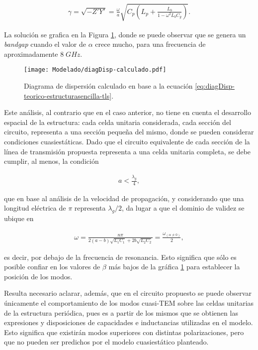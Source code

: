 \begin{align}
	\label{eq:diagDisp-teorico-estructurasencilla-tls}
	\gamma = \sqrt{-Z'Y'} = \frac{\omega}{a} \sqrt{C_p \left( L_p + \frac{L_b}{1-\omega^2 L_b C_g}\right)}.
\end{align}

La solución se grafica en la Figura \ref{fig:diagDisp-calculado-celdafacil}, donde se puede observar que se genera un \textit{bandgap} cuando el valor de $\alpha$ crece mucho, para una frecuencia de aproximadamente $8\;GHz$.

\begin{figure}[h]
	\centering
	\texttt{[image: Modelado/diagDisp-calculado.pdf]}
	\caption{Diagrama de dispersión calculado en base a la ecuación \ref{eq:diagDisp-teorico-estructurasencilla-tls}.}
	\label{fig:diagDisp-calculado-celdafacil}
\end{figure}

Este análisis, al contrario que en el caso anterior, no tiene en cuenta el desarrollo espacial de la estructura: cada celda unitaria considerada, cada sección del circuito, representa a una sección pequeña del mismo, donde se pueden considerar condiciones cuasiestáticas. Dado que el circuito equivalente de cada sección de la línea de transmisión propuesta representa a una celda unitaria completa, se debe cumplir, al menos, la condición \cite{Caloz:ElectromagneticMetamaterials}

\begin{align}
	a < \frac{\lambda_g}{4},
\end{align}

que en base al análisis de la velocidad de propagación, y considerando que una longitud eléctrica de $\pi$ representa $\lambda_g / 2$, da lugar a que el dominio de validez se ubique en

\begin{align}
	\omega = \frac{n\pi}{2 (a-b) \sqrt{L_1 C_1} + 2 b \sqrt{L_2 C_2}} = \frac{\omega_{(\alpha\neq 0)}}{2},
\end{align}

es decir, por debajo de la frecuencia de resonancia. Esto significa que sólo es posible confiar en los valores de $\beta$ más bajos de la gráfica \ref{fig:diagDisp-calculado-celdafacil} para establecer la posición de los modos.

Resulta necesario aclarar, además, que en el circuito propuesto se puede observar únicamente el comportamiento de los modos cuasi-TEM sobre las celdas unitarias de la estructura periódica, pues es a partir de los mismos que se obtienen las expresiones y disposiciones de capacidades e inductancias utilizadas en el modelo. Esto significa que existirán modos superiores con distintas polarizaciones, pero que no pueden ser predichos por el modelo cuasiestático planteado.


